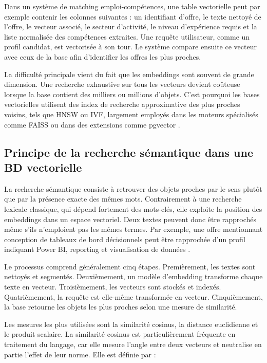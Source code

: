 \documentclass[12pt,twoside]{report}
\begin{document}
Dans un système de matching emploi-compétences, une table vectorielle peut par exemple contenir les colonnes suivantes : un identifiant d'offre, le texte nettoyé de l'offre, le vecteur associé, le secteur d'activité, le niveau d'expérience requis et la liste normalisée des compétences extraites. Une requête utilisateur, comme un profil candidat, est vectorisée à son tour. Le système compare ensuite ce vecteur avec ceux de la base afin d'identifier les offres les plus proches.

La difficulté principale vient du fait que les embeddings sont souvent de grande dimension. Une recherche exhaustive sur tous les vecteurs devient coûteuse lorsque la base contient des milliers ou millions d'objets. C'est pourquoi les bases vectorielles utilisent des index de recherche approximative des plus proches voisins, tels que HNSW ou IVF, largement employés dans les moteurs spécialisés comme FAISS ou dans des extensions comme pgvector \cite{malkov2018hnsw,johnson2019faiss,pgvector2024}.

\subsection{Principe de la recherche sémantique dans une BD vectorielle}
La recherche sémantique consiste à retrouver des objets proches par le sens plutôt que par la présence exacte des mêmes mots. Contrairement à une recherche lexicale classique, qui dépend fortement des mots-clés, elle exploite la position des embeddings dans un espace vectoriel. Deux textes peuvent donc être rapprochés même s'ils n'emploient pas les mêmes termes. Par exemple, une offre mentionnant \og conception de tableaux de bord décisionnels \fg{} peut être rapprochée d'un profil indiquant \og Power BI, reporting et visualisation de données \fg{}.

Le processus comprend généralement cinq étapes. Premièrement, les textes sont nettoyés et segmentés. Deuxièmement, un modèle d'embedding transforme chaque texte en vecteur. Troisièmement, les vecteurs sont stockés et indexés. Quatrièmement, la requête est elle-même transformée en vecteur. Cinquièmement, la base retourne les objets les plus proches selon une mesure de similarité.

Les mesures les plus utilisées sont la similarité cosinus, la distance euclidienne et le produit scalaire. La similarité cosinus est particulièrement fréquente en traitement du langage, car elle mesure l'angle entre deux vecteurs et neutralise en partie l'effet de leur norme. Elle est définie par :
\end{document}
